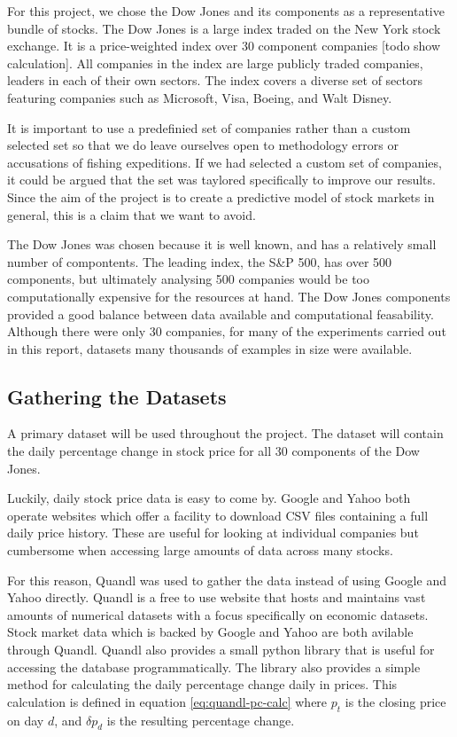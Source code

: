 \documentclass{report}
\begin{document}
For this project, we chose the Dow Jones and its components as a representative bundle of stocks. The Dow Jones is a large index traded on the New York stock exchange. It is a price-weighted index over 30 component companies [todo show calculation]. All companies in the index are large publicly traded companies, leaders in each of their own sectors. The index covers a diverse set of sectors featuring companies such as Microsoft, Visa, Boeing, and Walt Disney.

It is important to use a predefinied set of companies rather than a custom selected set so that we do leave ourselves open to methodology errors or accusations of fishing expeditions. If we had selected a custom set of companies, it could be argued that the set was taylored specifically to improve our results. Since the aim of the project is to create a predictive model of stock markets in general, this is a claim that we want to avoid. 

The Dow Jones was chosen because it is well known, and has a relatively small number of compontents. The leading index, the S\&P 500, has over 500 components, but ultimately analysing 500 companies would be too computationally expensive for the resources at hand. The Dow Jones components provided a good balance between data available and computational feasability. Although there were only 30 companies,  for many of the experiments carried out in this report, datasets many thousands of examples in size were available.

\subsection{Gathering the Datasets}

A primary dataset will be used throughout the project. The dataset will contain the daily percentage change in stock price for all 30 components of the Dow Jones.

Luckily, daily stock price data is easy to come by. Google and Yahoo both operate websites which offer a facility to download CSV files containing a full daily price history. These are useful for looking at individual companies but cumbersome when accessing large amounts of data across many stocks. 

For this reason, Quandl\cite{website:quandl} was used to gather the data instead of using Google and Yahoo directly. Quandl is a free to use website that hosts and maintains vast amounts of numerical datasets with a focus specifically on economic datasets. Stock market data which is backed by Google and Yahoo are both avilable through Quandl. Quandl also provides a small python library that is useful for accessing the database programmatically. The library also provides a simple method for calculating the daily percentage change daily in prices. This calculation is defined in equation \ref{eq:quandl-pc-calc} where $p_{t}$ is the closing price on day $d$, and $\delta p_{d}$ is the resulting percentage change.  
\end{document}
